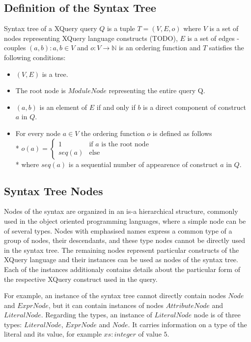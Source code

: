 \subsection{Definition of the Syntax Tree}
\begin{definition}
Syntax tree of a XQuery query $Q$ is a tuple $T = (V, E, o)$ where $V$ is a set of nodes representing XQuery language constructs (TODO), $E$ is a set of edges - couples $(a,b):a,b \in V$ and $o:V \rightarrow \mathbb{N}$ is an ordering function and $T$ satisfies the following conditions:
\begin{itemize}
\item $(V,E)$ is a tree.
\item The root node is $ModuleNode$ representing the entire query Q.
\item $(a,b)$ is an element of $E$ if and only if $b$ is a direct component of construct $a$ in $Q$.
\item For every node $a \in V$ the ordering function $o$ is defined as follows \\* $o(a) = \left\{
	\begin{array}{ll}
		1  & \mbox{if }a\mbox{ is the root node} \\
		seq(a) & \mbox{else}
	\end{array}
\right.$ \\* where $seq(a)$ is a sequential number of appearence of construct $a$ in $Q$.
\end{itemize}
\end{definition}

\subsection{Syntax Tree Nodes}
Nodes of the syntax are organized in an is-a hierarchical structure, commonly used in the object oriented programming languages, where a simple node can be of several types. Nodes with emphasised names express a common type of a group of nodes, their descendants, and these type nodes cannot be directly used in the syntax tree. The remaining nodes represent particular constructs of the XQuery language and their instances can be used as nodes of the syntax tree. Each of the instances additionaly contains details about the particular form of the respective XQuery construct used in the query.

For example, an instance of the syntax tree cannot directly contain nodes $Node$ and $ExprNode$, but it can contain instances of nodes $AttributeNode$ and $LiteralNode$. Regarding the types, an instance of $LiteralNode$ node is of three types: $LiteralNode$, $ExprNode$ and $Node$. It carries information on a type of the literal and its value, for example $xs:integer$ of value $5$. 

